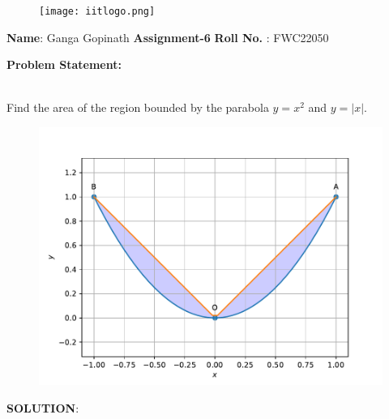 \documentclass[10pt,a4paper]{report}
\providecommand{\abs}[1]{\left\vert#1\right\vert}
\begin{document}
\begin{figure}[!tbp]
  \centering
  \begin{minipage}[b]{0.4\textwidth}
    \texttt{[image: iitlogo.png]}
  \end{minipage}
  \vspace{0.2cm}
\end{figure}
\raggedright \textbf{Name}:\hspace{1mm} Ganga Gopinath\hspace{3cm} \Large \textbf{Assignment-6}\hspace{2.5cm} %
\normalsize \textbf{Roll No.} :\hspace{1mm} FWC22050\vspace{1cm}
\begin{multicols}{2}

\raggedright \textbf{Problem Statement:}\vspace{2mm}
\raggedright \\ 
\fi
	Find the area of the region bounded by the parabola $y=x^2$ and $y= \abs{x}$.
	\\
	\solution
	\begin{figure}[!h]
		\centering
 \includegraphics[width=\columnwidth]{chapters/12/8/1/9/figs/con3.pdf}
		\caption{}
		\label{fig:12/8/1/9}
  	\end{figure}
	\iffalse
\vspace{5mm}
\raggedright \textbf{SOLUTION}:\vspace{2mm}\\


\end{multicols}
\end{document}
